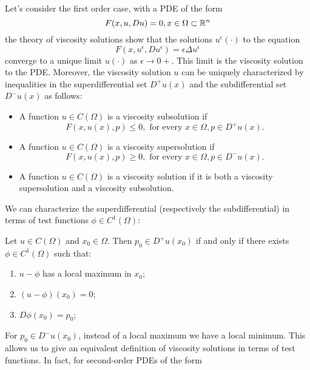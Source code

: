  Let's consider the first order case, with a PDE of the form
 \begin{equation*}
    F(x,u, D u) = 0, x \in \Omega \subset \mathbb{R}^n
 \end{equation*}
the theory of viscosity solutions show that the solutions $u^\epsilon(\cdot)$
to the equation
\begin{equation*}
    F(x, u^\epsilon, D u^\epsilon) = \epsilon \Delta u^\epsilon
\end{equation*}
converge to a unique limit $u(\cdot)$ as $\epsilon \to 0+$.
This limit is the viscosity solution to the PDE.
Moreover, the viscosity solution $u$ can be uniquely characterized by inequalities
in the superdifferential set $D^+ u(x)$ and the subdifferential set $D^- u(x)$
as follows:
\begin{itemize}
    \item A function $u \in C(\Omega)$ is a viscosity subsolution if
\begin{equation*}
    F(x, u(x), p) \leq 0, \text{ for every } x \in \Omega, p \in D^+ u(x).
\end{equation*}
    \item A function $u \in C(\Omega)$ is a viscosity supersolution if
\begin{equation*}
    F(x, u(x), p) \geq 0, \text{ for every } x \in \Omega, p \in D^- u(x).
\end{equation*}
    \item A function $u \in C(\Omega)$ is a viscosity solution if it is both
    a viscosity supersolution and a viscosity subsolution.
\end{itemize}
We can characterize the superdifferential (respectively the subdifferential) in
terms of test functions $\phi \in C^1(\Omega)$:
\begin{lemma}
    Let $u \in C(\Omega)$ and $x_0 \in \Omega$. Then $p_0  \in D^+ u(x_0)$ if and 
    only if there exists $\phi \in C^1(\Omega)$ such that:
\begin{enumerate}
    \item $u - \phi$ has a local maximum in $x_0$;
    \item $(u - \phi)(x_0) = 0$;
    \item $D \phi(x_0) = p_0$;
\end{enumerate}
\end{lemma}
For $p_0 \in D^- u(x_0)$, instead of a local maximum we have a local minimum.
This allows us to give an equivalent definition of viscosity solutions in terms 
of test functions. In fact, for second-order PDEs
of the form
